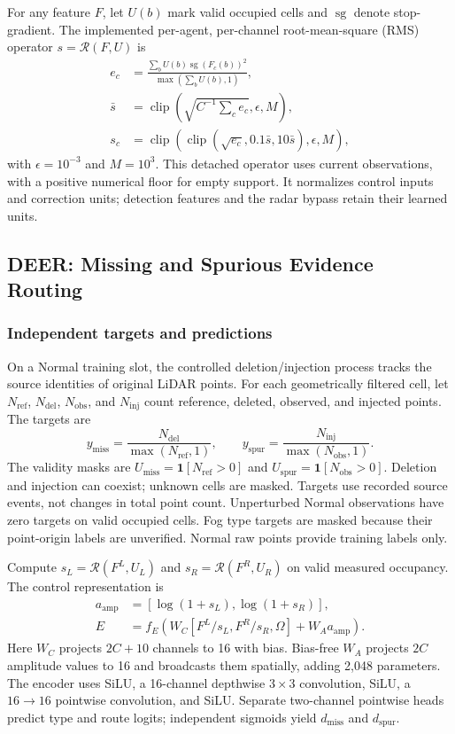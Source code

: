 \documentclass[conference]{IEEEtran}
\DeclareMathOperator{\sg}{sg}
\DeclareMathOperator{\clip}{clip}
\begin{document}
For any feature $F$, let $U(b)$ mark valid occupied cells and $\sg$ denote stop-gradient. The implemented per-agent, per-channel root-mean-square (RMS) operator $s=\mathcal R(F,U)$ is
\begin{align}
e_c&=\frac{\sum_b U(b)\sg(F_c(b))^2}{\max(\sum_b U(b),1)},\nonumber\\
\bar s&=\clip\!\left(\sqrt{C^{-1}\textstyle\sum_c e_c},\epsilon,M\right),\nonumber\\
s_c&=\clip\!\left(\clip(\sqrt{e_c},0.1\bar s,10\bar s),\epsilon,M\right), \label{eq:rms}
\end{align}
with $\epsilon=10^{-3}$ and $M=10^3$. This detached operator uses current observations, with a positive numerical floor for empty support. It normalizes control inputs and correction units; detection features and the radar bypass retain their learned units.

\subsection{DEER: Missing and Spurious Evidence Routing}
\subsubsection{Independent targets and predictions}
On a Normal training slot, the controlled deletion/injection process tracks the source identities of original LiDAR points. For each geometrically filtered cell, let $N_{\mathrm{ref}}$, $N_{\mathrm{del}}$, $N_{\mathrm{obs}}$, and $N_{\mathrm{inj}}$ count reference, deleted, observed, and injected points. The targets are
\begin{equation}
y_{\mathrm{miss}}=\frac{N_{\mathrm{del}}}{\max(N_{\mathrm{ref}},1)},\qquad
y_{\mathrm{spur}}=\frac{N_{\mathrm{inj}}}{\max(N_{\mathrm{obs}},1)}. \label{eq:targets}
\end{equation}
The validity masks are $U_{\mathrm{miss}}=\mathbf1[N_{\mathrm{ref}}>0]$ and $U_{\mathrm{spur}}=\mathbf1[N_{\mathrm{obs}}>0]$. Deletion and injection can coexist; unknown cells are masked. Targets use recorded source events, not changes in total point count. Unperturbed Normal observations have zero targets on valid occupied cells. Fog type targets are masked because their point-origin labels are unverified. Normal raw points provide training labels only.

Compute $s_L=\mathcal R(F^L,U_L)$ and $s_R=\mathcal R(F^R,U_R)$ on valid measured occupancy. The control representation is
\begin{align}
a_{\mathrm{amp}}&=[\log(1+s_L),\log(1+s_R)],\nonumber\\
E&=f_E\!\left(W_C[F^L/s_L,F^R/s_R,\Omega]+W_Aa_{\mathrm{amp}}\right). \label{eq:evidence}
\end{align}
Here $W_C$ projects $2C+10$ channels to 16 with bias. Bias-free $W_A$ projects $2C$ amplitude values to 16 and broadcasts them spatially, adding 2,048 parameters. The encoder uses SiLU, a 16-channel depthwise $3\times3$ convolution, SiLU, a $16\!\to\!16$ pointwise convolution, and SiLU. Separate two-channel pointwise heads predict type and route logits; independent sigmoids yield $d_{\mathrm{miss}}$ and $d_{\mathrm{spur}}$.
\end{document}
